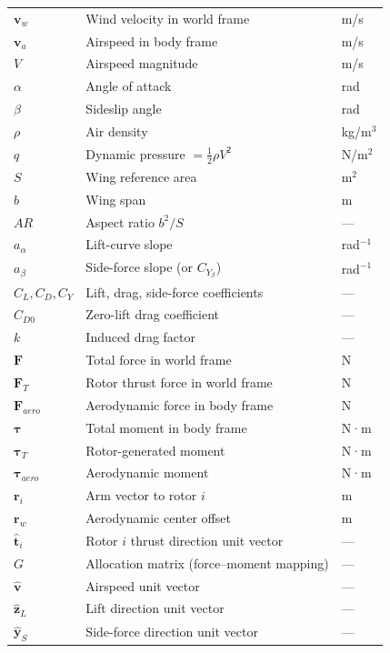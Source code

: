 \begin{longtable}{p{}p{}p{}}
\midrule
$\mathbf{v}_w$ & Wind velocity in world frame & m/s \\
$\mathbf{v}_a$ & Airspeed in body frame & m/s \\
$V$ & Airspeed magnitude & m/s \\
$\alpha$ & Angle of attack & rad \\
$\beta$ & Sideslip angle & rad \\
$\rho$ & Air density & kg/m$^3$ \\
$q$ & Dynamic pressure $=\tfrac{1}{2}\rho V^2$ & N/m$^2$ \\
$S$ & Wing reference area & m$^2$ \\
$b$ & Wing span & m \\
$AR$ & Aspect ratio $b^2/S$ & --- \\
$a_\alpha$ & Lift-curve slope & rad$^{-1}$ \\
$a_\beta$ & Side-force slope (or $C_{Y_\beta}$) & rad$^{-1}$ \\
$C_L, C_D, C_Y$ & Lift, drag, side-force coefficients & --- \\
$C_{D0}$ & Zero-lift drag coefficient & --- \\
$k$ & Induced drag factor & --- \\
\midrule
$\mathbf{F}$ & Total force in world frame & N \\
$\mathbf{F}_T$ & Rotor thrust force in world frame & N \\
$\mathbf{F}_{\!aero}$ & Aerodynamic force in body frame & N \\
$\boldsymbol{\tau}$ & Total moment in body frame & N·m \\
$\boldsymbol{\tau}_T$ & Rotor-generated moment & N·m \\
$\boldsymbol{\tau}_{\!aero}$ & Aerodynamic moment & N·m \\
$\mathbf{r}_i$ & Arm vector to rotor $i$ & m \\
$\mathbf{r}_w$ & Aerodynamic center offset & m \\
$\hat{\mathbf{t}}_i$ & Rotor $i$ thrust direction unit vector & --- \\
$G$ & Allocation matrix (force–moment mapping) & --- \\
$\hat{\mathbf{v}}$ & Airspeed unit vector & --- \\
$\hat{\mathbf{z}}_L$ & Lift direction unit vector & --- \\
$\hat{\mathbf{y}}_S$ & Side-force direction unit vector & --- \\
\end{longtable}

